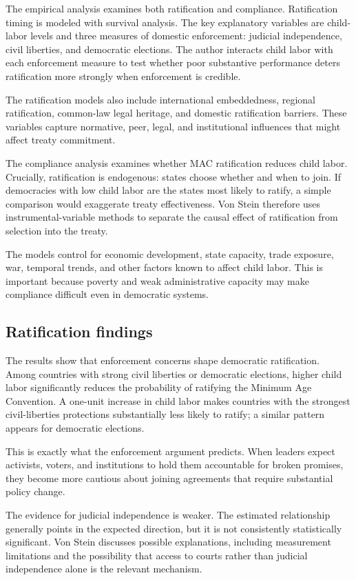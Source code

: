 The empirical analysis examines both ratification and compliance. Ratification timing is modeled with survival analysis. The key explanatory variables are child-labor levels and three measures of domestic enforcement: judicial independence, civil liberties, and democratic elections. The author interacts child labor with each enforcement measure to test whether poor substantive performance deters ratification more strongly when enforcement is credible.

The ratification models also include international embeddedness, regional ratification, common-law legal heritage, and domestic ratification barriers. These variables capture normative, peer, legal, and institutional influences that might affect treaty commitment.

The compliance analysis examines whether MAC ratification reduces child labor. Crucially, ratification is endogenous: states choose whether and when to join. If democracies with low child labor are the states most likely to ratify, a simple comparison would exaggerate treaty effectiveness. Von Stein therefore uses instrumental-variable methods to separate the causal effect of ratification from selection into the treaty.

The models control for economic development, state capacity, trade exposure, war, temporal trends, and other factors known to affect child labor. This is important because poverty and weak administrative capacity may make compliance difficult even in democratic systems.

\subsection{Ratification findings}

The results show that enforcement concerns shape democratic ratification. Among countries with strong civil liberties or democratic elections, higher child labor significantly reduces the probability of ratifying the Minimum Age Convention. A one-unit increase in child labor makes countries with the strongest civil-liberties protections substantially less likely to ratify; a similar pattern appears for democratic elections.

This is exactly what the enforcement argument predicts. When leaders expect activists, voters, and institutions to hold them accountable for broken promises, they become more cautious about joining agreements that require substantial policy change.

The evidence for judicial independence is weaker. The estimated relationship generally points in the expected direction, but it is not consistently statistically significant. Von Stein discusses possible explanations, including measurement limitations and the possibility that access to courts rather than judicial independence alone is the relevant mechanism.

